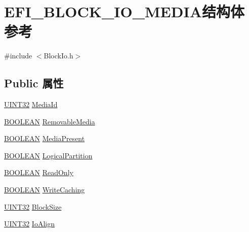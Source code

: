 \hypertarget{struct_e_f_i___b_l_o_c_k___i_o___m_e_d_i_a}{}\section{E\+F\+I\+\_\+\+B\+L\+O\+C\+K\+\_\+\+I\+O\+\_\+\+M\+E\+D\+I\+A结构体 参考}
\label{struct_e_f_i___b_l_o_c_k___i_o___m_e_d_i_a}


{\ttfamily \#include $<$Block\+Io.\+h$>$}

\subsection*{Public 属性}
\begin{DoxyCompactItemize}
\item 
\hyperlink{_processor_bind_8h_ae1e6edbbc26d6fbc71a90190d0266018}{U\+I\+N\+T32} \hyperlink{struct_e_f_i___b_l_o_c_k___i_o___m_e_d_i_a_a7b5117f5bd52a4f81a8f6c4e0be6a039}{Media\+Id}
\item 
\hyperlink{_processor_bind_8h_a112e3146cb38b6ee95e64d85842e380a}{B\+O\+O\+L\+E\+AN} \hyperlink{struct_e_f_i___b_l_o_c_k___i_o___m_e_d_i_a_a08f652e3b7b4f34d9d05100133039722}{Removable\+Media}
\item 
\hyperlink{_processor_bind_8h_a112e3146cb38b6ee95e64d85842e380a}{B\+O\+O\+L\+E\+AN} \hyperlink{struct_e_f_i___b_l_o_c_k___i_o___m_e_d_i_a_ac67e4efd7f139b76a2cfcf5750fb52fc}{Media\+Present}
\item 
\hyperlink{_processor_bind_8h_a112e3146cb38b6ee95e64d85842e380a}{B\+O\+O\+L\+E\+AN} \hyperlink{struct_e_f_i___b_l_o_c_k___i_o___m_e_d_i_a_a1d35f5bb70d1ca8ebe627474803faa3f}{Logical\+Partition}
\item 
\hyperlink{_processor_bind_8h_a112e3146cb38b6ee95e64d85842e380a}{B\+O\+O\+L\+E\+AN} \hyperlink{struct_e_f_i___b_l_o_c_k___i_o___m_e_d_i_a_acd0f44b5af1c8c00f35138ca78c0cf4a}{Read\+Only}
\item 
\hyperlink{_processor_bind_8h_a112e3146cb38b6ee95e64d85842e380a}{B\+O\+O\+L\+E\+AN} \hyperlink{struct_e_f_i___b_l_o_c_k___i_o___m_e_d_i_a_a43cb62d1de918180aa1c6ea9ae79a723}{Write\+Caching}
\item 
\hyperlink{_processor_bind_8h_ae1e6edbbc26d6fbc71a90190d0266018}{U\+I\+N\+T32} \hyperlink{struct_e_f_i___b_l_o_c_k___i_o___m_e_d_i_a_a2e70f9bd2806fefdfa6d56b2d4f64a8d}{Block\+Size}
\item 
\hyperlink{_processor_bind_8h_ae1e6edbbc26d6fbc71a90190d0266018}{U\+I\+N\+T32} \hyperlink{struct_e_f_i___b_l_o_c_k___i_o___m_e_d_i_a_a084b56a43a70914b1de64b1076ffacef}{Io\+Align}

\end{DoxyCompactItemize}
